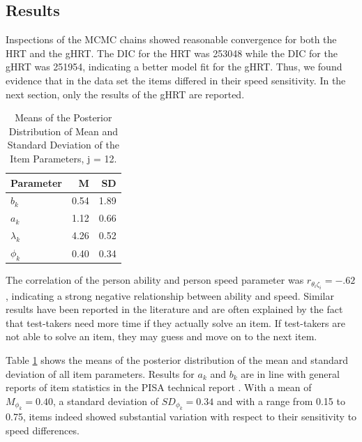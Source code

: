 \documentclass[a4paper,man,apacite,donotrepeattitle]{apa6}
\begin{document}
\subsection{Results} 
Inspections of the MCMC chains showed reasonable convergence for both the HRT and the gHRT. The DIC for the HRT was 253048 while the DIC for the gHRT was 251954, indicating a better model fit for the gHRT. Thus, we found evidence that in the data set the items differed in their speed sensitivity. In the next section, only the results of the gHRT are reported.

\begin{table}[ht]
\centering
\caption{Means of the Posterior Distribution of Mean and Standard Deviation of the Item Parameters, j = 12.} 
\begin{tabular}{lrr}
  \hline
Parameter & M & SD \\ 
  \hline
$b_{k}$ & 0.54 & 1.89 \\ 
  $a_{k}$ & 1.12 & 0.66 \\ 
  $\lambda_{k}$ & 4.26 & 0.52 \\ 
  $\phi_{k}$ & 0.40 & 0.34 \\ 
   \hline
\end{tabular}
\label{tab:postMeans}
\end{table}

The correlation of the person ability and person speed parameter was $r_{\theta_{i}  \zeta_{i}} = -.62$, indicating a strong negative relationship between ability and speed. Similar results have been reported in the literature \cite<see also,>{Debelak.2014,Goldhammer.2011,Scherer.2015} and are often explained by the fact that test-takers need more time if they actually solve an item. If test-takers are not able to solve an item, they may guess and move on to the next item. 

Table \ref{tab:postMeans} shows the means of the posterior distribution of the mean and standard deviation of all item parameters. Results for $a_{k}$ and $b_{k}$ are in line with general reports of item statistics in the PISA technical report \cite{PISA.2015results}. With a mean of $M_{\phi_k} = 0.40$, a standard deviation of $SD_{\phi_k} = 0.34$ and with a range from 0.15 to 0.75, items indeed showed substantial variation with respect to their sensitivity to speed differences. 
\end{document}
